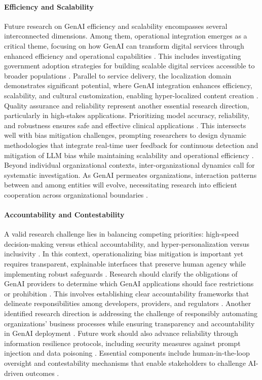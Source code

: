\paragraph{Efficiency and Scalability}
Future research on GenAI efficiency and scalability encompasses several interconnected dimensions. Among them, operational integration emerges as a critical theme, focusing on how GenAI can transform digital services through enhanced efficiency and operational capabilities \parencite{R08}. This includes investigating government adoption strategies for building scalable digital services accessible to broader populations \parencite{R08}. Parallel to service delivery, the localization domain demonstrates significant potential, where GenAI integration enhances efficiency, scalability, and cultural customization, enabling hyper-localized content creation \parencite{R03}.
Quality assurance and reliability represent another essential research direction, particularly in high-stakes applications. Prioritizing model accuracy, reliability, and robustness ensures safe and effective clinical applications \parencite{S16}. This intersects well with bias mitigation challenges, prompting researchers to design dynamic methodologies that integrate real-time user feedback for continuous detection and mitigation of LLM bias while maintaining scalability and operational efficiency \parencite{R01}.
Beyond individual organizational contexts, inter-organizational dynamics call for systematic investigation. As GenAI permeates organizations, interaction patterns between and among entities will evolve, necessitating research into efficient cooperation across organizational boundaries \parencite{R10}.

\paragraph{Accountability and Contestability}
A valid research challenge lies in balancing competing priorities: high-speed decision-making versus ethical accountability, and hyper-personalization versus inclusivity \parencite{R01}. In this context, operationalizing bias mitigation is important yet requires transparent, explainable interfaces that preserve human agency while implementing robust safeguards \parencite{S17}.
Research should clarify the obligations of GenAI providers to determine which GenAI applications should face restrictions or prohibition \parencite{R07}. This involves establishing clear accountability frameworks that delineate responsibilities among developers, providers, and regulators \parencite{S17}. Another identified research direction is addressing the challenge of responsibly automating organizations' business processes while ensuring transparency and accountability in GenAI deployment \parencite{R08}.
Future work should also advance reliability through information resilience protocols, including security measures against prompt injection and data poisoning \parencite{S17}. Essential components include human-in-the-loop oversight and contestability mechanisms that enable stakeholders to challenge AI-driven outcomes \parencite{S17}.

